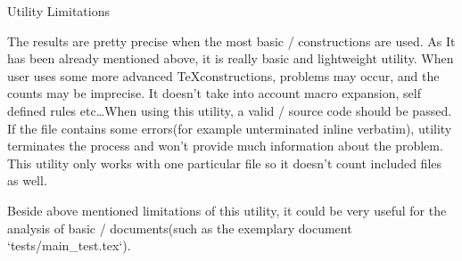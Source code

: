 \sec Utility Limitations

The results are pretty precise when the most basic \OpTeX/ constructions are used.
As It has been already mentioned above, it is really basic and lightweight utility.
When user uses some more advanced \TeX constructions, problems may occur, and the counts may be imprecise.
It doesn't take into account macro expansion, self defined rules etc\dots When using this utility, a valid \OpTeX/ source code should be passed.
If the file contains some errors(for example unterminated inline verbatim), utility terminates the process and won't provide much information about the problem.
This utility only works with one particular file so it doesn't count included files as well.

Beside above mentioned limitations of this utility, it could be very useful for the analysis of basic \OpTeX/ documents(such as the exemplary document {\Blue `tests/main_test.tex`}).

\bye
